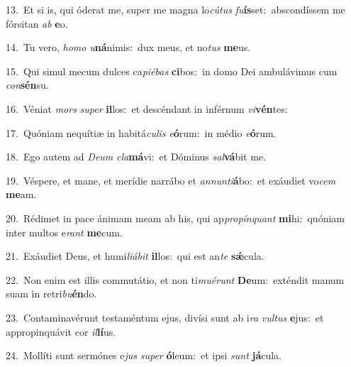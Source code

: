 {\numbfont\textcolor{\numbcolor}{13.}}~Et si is, qui óderat me, super me magna lo\-\textit{cú}\-\textit{tus} \textit{fu}\-\textbf{ís}set:~\star abscondíssem me fórsitan \textit{ab} \textbf{e}\-o.\par
{\numbfont\textcolor{\numbcolor}{14.}}~Tu vero, \textit{ho}\-\textit{mo} \textit{u}\-\textbf{ná}nimis:~\star dux meus, et no\textit{tus} \textbf{me}\-us.\par
{\numbfont\textcolor{\numbcolor}{15.}}~Qui simul mecum dulces ca\-\textit{pi}\-\textit{é}\textit{bas} \textbf{ci}\-bos:~\star in domo Dei ambulávimus cum \textit{con}\-\textbf{sén}su.\par
{\numbfont\textcolor{\numbcolor}{16.}}~Véniat \textit{mors} \textit{su}\-\textit{per} \textbf{il}\-los:~\star et descéndant in inférnum \textit{vi}\-\textbf{vén}tes:\par
{\numbfont\textcolor{\numbcolor}{17.}}~Quóniam nequítiæ in habitá\-\textit{cu}\-\textit{lis} \textit{e}\-\textbf{ó}rum:~\star in médio \textit{e}\-\textbf{ó}rum.\par
{\numbfont\textcolor{\numbcolor}{18.}}~Ego autem ad \textit{De}\-\textit{um} \textit{cla}\-\textbf{má}vi:~\star et Dóminus \textit{sal}\-\textbf{vá}bit me.\par
{\numbfont\textcolor{\numbcolor}{19.}}~Véspere, et mane, et merídie narrábo et \textit{an}\-\textit{nun}\textit{ti}\textbf{á}bo:~\star et exáudiet vo\textit{cem} \textbf{me}\-am.\par
{\numbfont\textcolor{\numbcolor}{20.}}~Rédimet in pace ánimam meam ab his, qui ap\-\textit{pro}\-\textit{pín}\textit{quant} \textbf{mi}\-hi:~\star quóniam inter multos e\textit{rant} \textbf{me}\-cum.\par
{\numbfont\textcolor{\numbcolor}{21.}}~Exáudiet Deus, et humi\-\textit{li}\-\textit{á}\textit{bit} \textbf{il}\-los:~\star qui est an\textit{te} \textbf{sǽ}\-cula.\par
{\numbfont\textcolor{\numbcolor}{22.}}~Non enim est illis commutátio, et non ti\-\textit{mu}\-\textit{é}\textit{runt} \textbf{De}\-um:~\star exténdit manum suam in retri\-\textit{bu}\-\textbf{én}do.\par
{\numbfont\textcolor{\numbcolor}{23.}}~Contaminavérunt testaméntum ejus, divísi sunt ab i\textit{ra} \textit{vul}\-\textit{tus} \textbf{e}\-jus:~\star et appropinquávit cor \textit{il}\-\textbf{lí}us.\par
{\numbfont\textcolor{\numbcolor}{24.}}~Mollíti sunt sermónes e\textit{jus} \textit{su}\-\textit{per} \textbf{ó}\-leum:~\star et ipsi \textit{sunt} \textbf{já}\-cula.\par
